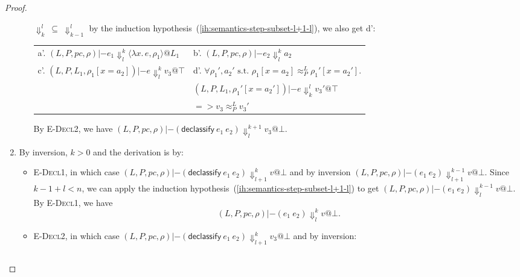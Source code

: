 \documentclass{article}
\makeatletter
\theoremstyle{definition}
\newcommand{\at}{\ensuremath{{\scriptstyle{@}}}}
\newcommand{\pc}{\ensuremath{{\mathit{pc}}}}
\makeatother
\begin{document}
\begin{proof}
\begin{enumerate}
\begin{itemize}
      $\Downarrow^{l}_{k}\ \subseteq\ \Downarrow^{l}_{k-1}$ by
      the induction hypothesis~(\ref{ih:semantics-step-subset-l+1-l}),
      we also get d':
      \begin{center}
        \begin{tabular*}{1.0\linewidth}{l@{\qquad}l}
          a'.
          $(L, P, \pc, \rho) |- e_1
          \Downarrow^{k}_{l}
          \langle{\lambda{x}.\, e, \rho_1\rangle} \at L_1$
          &
          b'.
          $(L, P, \pc, \rho) |- e_2
          \Downarrow^{k}_{l}
          a_2$
          \\[1.8ex]
          c'.
          $(L, P, L_1, \rho_1[x = a_2]) |- e
          \Downarrow^{k}_{l}
          v_3 \at \top$
          &
          d'.
          $\forall{\rho_1', a_2' \text{ s.t. }
            \rho_1[x = a_2] \approx^{L}_{P} \rho_1'[x = a_2']}.$
          \\
          &
          \quad\quad
          $(L, P, L_1, \rho_1'[x = a_2']) |- e
          \Downarrow^{l}_{k} v_3' \at \top$
          \\
          &
          \quad\quad
          $=>
          v_3 \approx^{L}_{P} v_3'$
        \end{tabular*}
      \end{center}
      By \textsc{E-Decl2}, we have
      $(L, P, \pc, \rho) |- (\mathsf{declassify}\ e_1\ e_2)
      \Downarrow^{k+1}_{l}
      v_3 \at \bot$.
    \end{itemize}
  \item By inversion, $k > 0$ and the derivation is by:
    \begin{itemize}
    \item \textsc{E-Decl1}, in which case
      $(L, P, \pc, \rho) |- (\mathsf{declassify}\ e_1\ e_2)
      \Downarrow^{k}_{l+1}
      v \at \bot$ and by inversion
      $(L, P, \pc, \rho) |- (e_1\ e_2)
      \Downarrow^{k-1}_{l+1} v \at \bot$.
      Since $k-1 + l < n$, we can apply the induction
      hypothesis~(\ref{ih:semantics-step-subset-l+1-l}) to get
      $(L, P, \pc, \rho) |- (e_1\ e_2)
      \Downarrow^{k-1}_{l} v \at \bot$.
      By \textsc{E-Decl1}, we have
      \[ (L, P, \pc, \rho) |- (e_1\ e_2)
      \Downarrow^{k}_{l} v \at \bot. \]
    \item \textsc{E-Decl2}, in which case
      $(L, P, \pc, \rho) |- (\mathsf{declassify}\ e_1\ e_2)
      \Downarrow^{k}_{l+1}
      v_3 \at \bot$ and by inversion:
      \begin{center}
        \begin{tabular*}{1.0\linewidth}{ll}

\end{tabular*}
\end{center}
\end{itemize}
\end{enumerate}
\end{proof}
\end{document}
